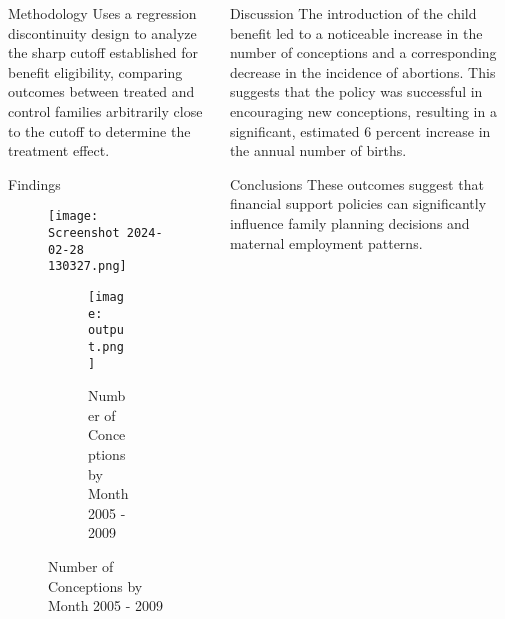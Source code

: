 \begin{frame}[t]
\begin{columns}[T]
\begin{column}{.32\textwidth}
    \begin{block}{\Huge Methodology} %
    \Large %
    Uses a regression discontinuity design to analyze the sharp cutoff established for benefit eligibility, comparing outcomes between treated and control families arbitrarily close to the cutoff to determine the treatment effect.
    \normalsize
    \end{block}

    \vspace{1cm} %

    \begin{block}{\Huge Findings} %
    \Large %

    \Large
\begin{figure}
    \centering
    \texttt{[image: Screenshot 2024-02-28 130327.png]}
    \caption{Number of Abortions by Month 2005 -2009}
    \label{fig:enter-label}
    \begin{figure}
        \centering
        \texttt{[image: output.png]}
        \caption{Number of Conceptions by Month 2005 - 2009}
        \label{fig:enter-label}
    \end{figure}
\end{figure}
    \end{block}
\end{column}

\begin{column}{.32\textwidth}
    \begin{block}{\Huge Discussion} %
    \Large %
   The introduction of the child benefit led to a noticeable increase in the number of conceptions and a corresponding decrease in the incidence of abortions. This suggests that the policy was successful in encouraging new conceptions, resulting in a significant, estimated 6 percent increase in the annual number of births. 
    \normalsize 
    \end{block}

    \vspace{1cm} %

    \begin{block}{\Huge Conclusions} %
    \Large %
 These outcomes suggest that financial support policies can significantly influence family planning decisions and maternal employment patterns.
    \normalsize
    \end{block}


\end{column}
\end{columns}
\end{frame}
